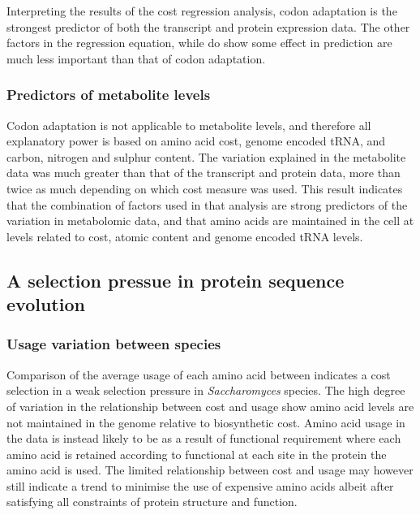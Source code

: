 Interpreting the results of the cost regression analysis, codon adaptation is the strongest predictor of both the transcript and protein expression data. The other factors in the regression equation, while do show some effect in prediction are much less important than that of codon adaptation.

\subsubsection{Predictors of metabolite levels}

Codon adaptation is not applicable to metabolite levels, and therefore all explanatory power is based on amino acid cost, genome encoded tRNA, and carbon, nitrogen and sulphur content. The variation explained in the metabolite data was much greater than that of the transcript and protein data, more than twice as much depending on which cost measure was used. This result indicates that the combination of factors used in that analysis are strong predictors of the variation in metabolomic data, and that amino acids are maintained in the cell at levels related to cost, atomic content and genome encoded tRNA levels.

\subsection{A selection pressue in protein sequence evolution}

\subsubsection{Usage variation between species}

Comparison of the average usage of each amino acid between indicates a cost selection in a weak selection pressure in \emph{Saccharomyces} species. The high degree of variation in the relationship between cost and usage show amino acid levels are not maintained in the genome relative to biosynthetic cost. Amino acid usage in the data is instead likely to be as a result of functional requirement where each amino acid is retained according to functional at each site in the protein the amino acid is used. The limited relationship between cost and usage may however still indicate a trend to minimise the use of expensive amino acids albeit after satisfying all constraints of protein structure and function.

